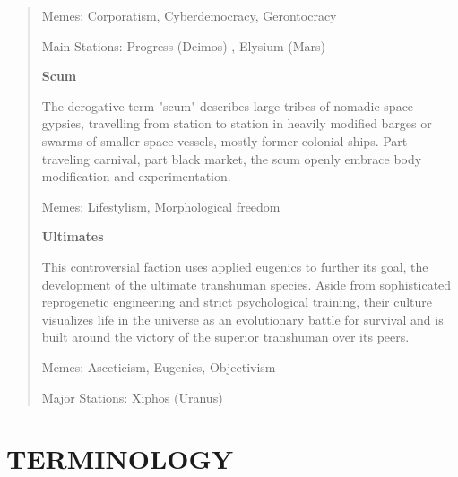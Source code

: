 \begin{quote}
   Memes: Corporatism, Cyberdemocracy, Gerontocracy

   Main Stations: Progress (Deimos) , Elysium (Mars)


   \textbf{Scum}

   The derogative term "scum" describes large tribes of nomadic space gypsies,
   travelling from station to station in heavily modified barges or swarms of
   smaller space vessels, mostly former colonial ships. Part traveling
   carnival, part black market, the scum openly embrace body modification
   and experimentation.

   Memes: Lifestylism, Morphological freedom


   \textbf{Ultimates}

   This controversial faction uses applied eugenics to further its goal, the
   development of the ultimate transhuman species. Aside from sophisticated
   reprogenetic engineering and strict psychological training, their culture
   visualizes life in the universe as an evolutionary battle for survival and
   is built around the victory of the superior transhuman over its peers.

   Memes: Asceticism, Eugenics, Objectivism

   Major Stations: Xiphos (Uranus)
\end{quote}


\section{TERMINOLOGY}

